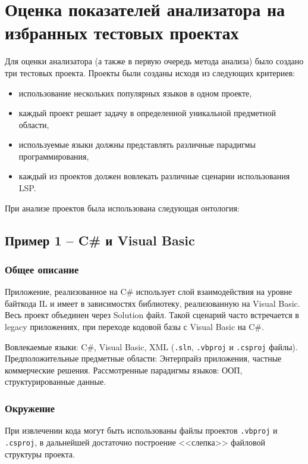 \chapter{Оценка показателей анализатора на избранных тестовых проектах}

Для оценки анализатора (а также в первую очередь метода анализа) было создано три тестовых проекта.
Проекты были созданы исходя из следующих критериев:
\begin{itemize}
    \item использование нескольких популярных языков в одном проекте,
    \item каждый проект решает задачу в определенной уникальной предметной области,
    \item используемые языки должны представлять различные парадигмы программирования,
    \item каждый из проектов должен вовлекать различные сценарии использования LSP.
\end{itemize}

При анализе проектов была использована следующая онтология: %

\section{Пример 1 -- C\# и Visual Basic}

\subsection{Общее описание}

Приложение, реализованное на C\# использует слой взаимодействия на уровне байткода IL и имеет в зависимостях библиотеку,
реализованную на Visual Basic. Весь проект объединен через Solution файл. Такой сценарий часто встречается
в legacy приложениях, при переходе кодовой базы с Visual Basic на C\#.

Вовлекаемые языки: C\#, Visual Basic, XML (\texttt{.sln}, \texttt{.vbproj} и \texttt{.csproj} файлы).
Предположительные предметные области: Энтерпрайз приложения, частные коммерческие решения.
Рассмотренные парадигмы языков: ООП, структурированные данные.

\subsection{Окружение}

При извлечении кода могут быть использованы файлы проектов \texttt{.vbproj} и \texttt{.csproj}, в дальнейшей
достаточно построение <<слепка>> файловой структуры проекта.

